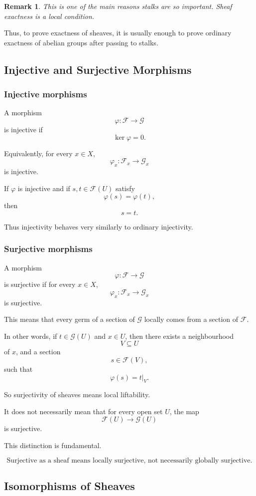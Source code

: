 \documentclass[12pt,a4paper]{article}
\newcommand{\F}{\mathcal F}
\newcommand{\G}{\mathcal G}
\theoremstyle{notespace}
\newtheorem{remark}[definition]{Remark}
\begin{document}
\begin{remark}
	This is one of the main reasons stalks are so important. Sheaf exactness is a local condition.
\end{remark}

Thus, to prove exactness of sheaves, it is usually enough to prove ordinary exactness of abelian groups after passing to stalks.

\subsection{Injective and Surjective Morphisms}

\subsubsection{Injective morphisms}

A morphism
\[
\varphi:\F\to \G
\]
is injective if
\[
\ker\varphi=0.
\]

Equivalently, for every \(x\in X\),
\[
\varphi_x:\F_x\to \G_x
\]
is injective.

If \(\varphi\) is injective and if \(s,t\in \F(U)\) satisfy
\[
\varphi(s)=\varphi(t),
\]
then
\[
s=t.
\]

Thus injectivity behaves very similarly to ordinary injectivity.

\subsubsection{Surjective morphisms}

A morphism
\[
\varphi:\F\to \G
\]
is surjective if for every \(x\in X\),
\[
\varphi_x:\F_x\to \G_x
\]
is surjective.

This means that every germ of a section of \(\G\) locally comes from a section of \(\F\).

In other words, if \(t\in \G(U)\) and \(x\in U\), then there exists a neighbourhood
\[
V\subseteq U
\]
of \(x\), and a section
\[
s\in \F(V),
\]
such that
\[
\varphi(s)=t|_V.
\]

So surjectivity of sheaves means local liftability.

It does not necessarily mean that for every open set \(U\), the map
\[
\F(U)\to \G(U)
\]
is surjective.

This distinction is fundamental.

\[
\boxed{
	\text{Surjective as a sheaf means locally surjective, not necessarily globally surjective.}
}
\]

\subsection{Isomorphisms of Sheaves}
\end{document}
